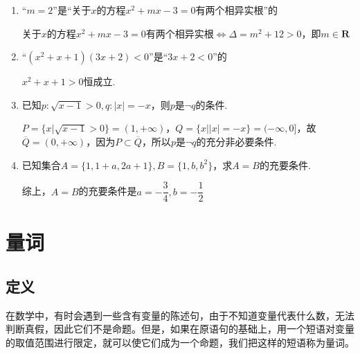 \begin{enumerate}
\begin{jieda}
\begin{enumerate}
        \end{enumerate}
    \end{jieda}
    \item “$m = 2$”是“关于$x$的方程$x^2+mx-3=0$有两个相异实根”的
    \begin{jieda}
        关于$x$的方程$x^2+mx-3=0$有两个相异实根$\Longleftrightarrow \Delta = m^2 + 12 > 0$，即$m \in \mathbf{R}$
    \end{jieda}
    \item “$(x^2+x+1)(3x+2) < 0$”是“$3x+2 < 0$”的
    \begin{jieda}
        $x^2+x+1 > 0$恒成立.
    \end{jieda}
    
    \item 已知$p: \sqrt{x-1} > 0, q: |x| = -x$，则$p$是$\neg q$的条件.
    \begin{jieda}
        $P = \{x | \sqrt{x-1} > 0\} = (1, +\infty)$，$Q = \{x | |x| = -x\} = (-\infty, 0]$，故$\overline{Q} = (0, +\infty)$，因为$P \subset \overline{Q}$，所以$p$是$\neg q$的充分非必要条件.
    \end{jieda}

    \item 已知集合$A = \{1, 1+a, 2a+1\}, B = \{1, b, b^2\}$，求$A = B$的充要条件.
    \begin{jieda}
        综上，$A = B$的充要条件是$a = -\dfrac{3}{4}, b = -\dfrac{1}{2}$
    \end{jieda}
\end{enumerate}

\section*{量词}
\subsection*{定义}
    在数学中，有时会遇到一些含有变量的陈述句，由于不知道变量代表什么数，无法判断真假，因此它们不是命题。但是，如果在原语句的基础上，用一个短语对变量的取值范围进行限定，就可以使它们成为一个命题，我们把这样的短语称为量词。
